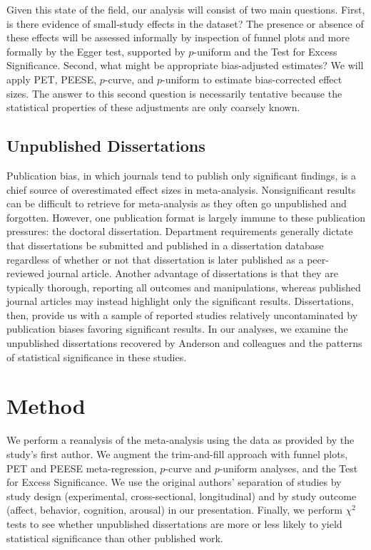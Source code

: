 \documentclass[man, mask]{apa6}
\begin{document}
Given this state of the field, our analysis will consist of two main questions.  First, is there evidence of small-study effects in the dataset?  The presence or absence of these effects will be assessed informally by inspection of funnel plots and more formally by the Egger test, supported by $p$-uniform and the Test for Excess Significance.  Second, what might be appropriate bias-adjusted estimates?  We will apply PET, PEESE, $p$-curve, and $p$-uniform to estimate bias-corrected effect sizes.  The answer to this second question is necessarily tentative because the statistical properties of these adjustments are only coarsely known.

\subsection{Unpublished Dissertations}
Publication bias, in which journals tend to publish only significant findings, is a chief source of overestimated effect sizes in meta-analysis. Nonsignificant results can be difficult to retrieve for meta-analysis as they often go unpublished and forgotten. However, one publication format is largely immune to these publication pressures: the doctoral dissertation. Department requirements generally dictate that dissertations be submitted and published in a dissertation database regardless of whether or not that dissertation is later published as a peer-reviewed journal article.  Another advantage of dissertations is that they are typically thorough, reporting all outcomes and manipulations, whereas published journal articles may instead highlight only the significant results.  Dissertations, then, provide us with a sample of reported studies relatively uncontaminated by publication biases favoring significant results. In our analyses, we examine the unpublished  dissertations recovered by Anderson and colleagues and the patterns of statistical significance in these studies.

\section{Method}
We perform a reanalysis of the \citet{Anderson:etal:2010} meta-analysis using the data as provided by the study's first author.  We augment the trim-and-fill approach with funnel plots, PET and PEESE meta-regression, $p$-curve and $p$-uniform analyses, and the Test for Excess Significance. We use the original authors' separation of studies by study design (experimental, cross-sectional, longitudinal) and by study outcome (affect, behavior, cognition, arousal) in our presentation. Finally, we perform $\chi^2$ tests to see whether unpublished dissertations are more or less likely to yield statistical significance than other published work.
\end{document}
